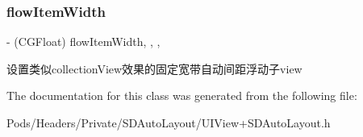 \subsubsection{\texorpdfstring{flow\+Item\+Width}{flowItemWidth}}
{\footnotesize\ttfamily -\/ (C\+G\+Float) flow\+Item\+Width\hspace{0.3cm}{\ttfamily [read]}, {\ttfamily [write]}, {\ttfamily [nonatomic]}, {\ttfamily [assign]}}

设置类似collection\+View效果的固定宽带自动间距浮动子view 

The documentation for this class was generated from the following file\+:\begin{DoxyCompactItemize}
\item 
Pods/\+Headers/\+Private/\+S\+D\+Auto\+Layout/U\+I\+View+\+S\+D\+Auto\+Layout.\+h\end{DoxyCompactItemize}
